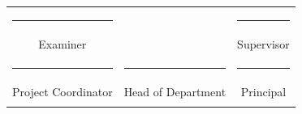 \begin{center}
\begin{tabular}{ccc}
      \rule{4.0cm}{1sp} & \hspace{0.7in}                & \hspace{0.3in} \rule{4.0cm}{1sp} \\ \vspace{0.65in}
       Examiner & \hspace{1in}             & \hspace{0.3in} Supervisor \\
      \rule{4.0cm}{1sp} & \hspace{0.5in} \rule{4.0cm}{1sp}                  &\hspace{0.45in} \rule{4.0cm}{1sp} \\
      Project Coordinator & \hspace{0.5in} Head of Department                &\hspace{0.65in} Principal \\\\
    \end{tabular}
\end{center}




%
\cleardoublepage

